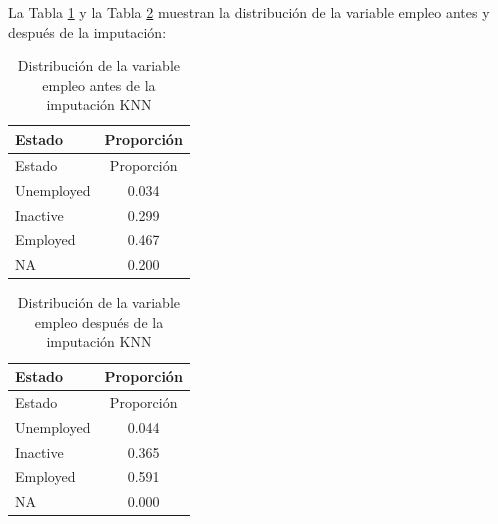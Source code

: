 \documentclass[
  spanish,
  12pt,
]{book}
\newenvironment{Shaded}{\begin{snugshade}}{\end{snugshade}}
\newcommand{\AttributeTok}[1]{\textcolor[rgb]{0.13,0.29,0.53}{#1}}
\newcommand{\FunctionTok}[1]{\textcolor[rgb]{0.13,0.29,0.53}{\textbf{#1}}}
\newcommand{\NormalTok}[1]{#1}
\newcommand{\SpecialCharTok}[1]{\textcolor[rgb]{0.81,0.36,0.00}{\textbf{#1}}}
\newcommand{\StringTok}[1]{\textcolor[rgb]{0.31,0.60,0.02}{#1}}
\begin{document}
La Tabla \ref{tab:tab-knn-empleo-antes} y la Tabla \ref{tab:tab-knn-empleo-despues} muestran la distribución de la variable empleo antes y después de la imputación:

\begin{Shaded}
\end{Shaded}

\begin{longtable}[]{@{}lc@{}}
\caption{\label{tab:tab-knn-empleo-antes}Distribución de la variable empleo antes de la imputación KNN}\tabularnewline
\toprule\noalign{}
Estado & Proporción \\
\midrule\noalign{}
\endfirsthead
\toprule\noalign{}
Estado & Proporción \\
\midrule\noalign{}
\endhead
\bottomrule\noalign{}
\endlastfoot
Unemployed & 0.034 \\
Inactive & 0.299 \\
Employed & 0.467 \\
NA & 0.200 \\
\end{longtable}

\begin{Shaded}
\end{Shaded}

\begin{longtable}[]{@{}lc@{}}
\caption{\label{tab:tab-knn-empleo-despues}Distribución de la variable empleo después de la imputación KNN}\tabularnewline
\toprule\noalign{}
Estado & Proporción \\
\midrule\noalign{}
\endfirsthead
\toprule\noalign{}
Estado & Proporción \\
\midrule\noalign{}
\endhead
\bottomrule\noalign{}
\endlastfoot
Unemployed & 0.044 \\
Inactive & 0.365 \\
Employed & 0.591 \\
NA & 0.000 \\
\end{longtable}
\end{document}
